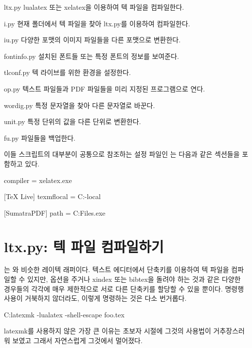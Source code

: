 \begin{macros}
\item[ltx.py] lualatex 또는 xelatex을 이용하여 텍 파일을 컴파일한다.
\item[i.py] 현재 폴더에서 텍 파일을 찾아 ltx.py를 이용하여 컴파일한다.
\item[iu.py] 다양한 포맷의 이미지 파일들을 다른 포맷으로 변환한다.
\item[fontinfo.py] 설치된 폰트들 또는 특정 폰트의 정보를 보여준다.
\item[tlconf.py] 텍 라이브를 위한 환경을 설정한다.
\item[op.py] 텍스트 파일들과 PDF 파일들을 미리 지정된 프로그램으로 연다.
\item[wordig.py] 특정 문자열을 찾아 다른 문자열로 바꾼다.
\item[unit.py] 특정 단위의 값을 다른 단위로 변환한다.
\item[fu.py] 파일들을 백업한다.
\end{macros}

이들 스크립트의 대부분이 공통으로 참조하는 설정 파일인 는 다음과 같은 섹션들을 포함하고 있다.

\begin{codewrite}
[LaTeX]
compiler = xelatex.exe

[TeX Live]
texmflocal = C:\texlive\texmf-local\tex\latex\local

[SumatraPDF]
path = C:\Program Files\SumatraPDF\SumatraPDF.exe
\end{codewrite}
\coderead[language=ini]

\section{ltx.py: 텍 파일 컴파일하기}

는 와 비슷한 레이텍 래퍼이다.
텍스트 에디터에서 단축키를 이용하여 텍 파일을 컴파일할 수 있지만,  옵션을 주거나 xindex 또는 bibtex을 돌려야 하는 것과 같은 다양한 경우들의 각각에 매우 제한적으로 서로 다른 단축키를 할당할 수 있을 뿐이다.
명령행 사용이 거북하지 않더라도, 이렇게 명령하는 것은 다소 번거롭다.

\begin{code}
C:\>latexmk -lualatex -shell-escape foo.tex
\end{code}

latexmk를 사용하지 않은 가장 큰 이유는 초보자 시절에 그것의 사용법이 거추장스러워 보였고 그래서 자연스럽게 그것에서 멀어졌다.

